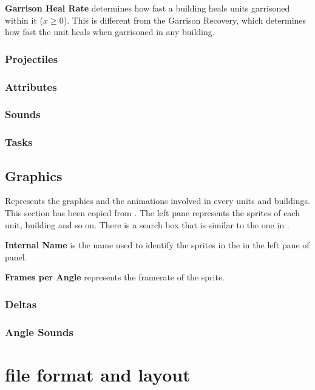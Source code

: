 \begin{appendices}
    \textbf{Garrison Heal Rate} determines how fast a building heals units garrisoned within it ($x \geq 0$). This is different from the Garrison Recovery, which determines how fast the unit heals when garrisoned in any building\cite{agewiki:2014}.

    \subsection{Projectiles}

    \subsection{Attributes}

    \subsection{Sounds}

    \subsection{Tasks}

    \section{Graphics}

    Represents the graphics and the animations involved in every units and buildings. This section has been copied from \cite{agewiki:grpahics:2014}. The left pane represents the sprites of each unit, building and so on. There is a search box that is similar to the one in .

    \textbf{Internal Name} is the name used to identify the sprites in the \genie{} in the left pane of  panel.

    \textbf{Frames per Angle} represents the framerate of the sprite.

    \subsection{Deltas}

    \subsection{Angle Sounds}

    

    \chapter{ file format and layout}
    \label{chp:rms}


\end{appendices}
